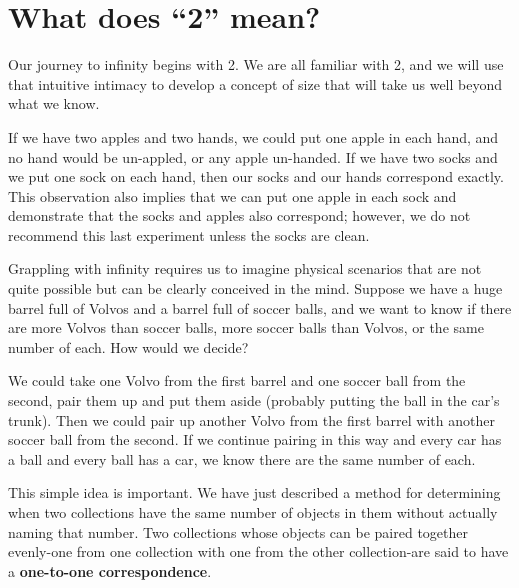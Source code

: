 \section{What does ``2'' mean?} \label{sec:correspondence}

Our journey to infinity begins with 2. We are all familiar with 2, and we will use that intuitive
intimacy to develop a concept of size that will take us well beyond what we know.

If we have two apples and two hands, we could put one apple in each hand, and no hand would be un-appled, or any apple un-handed. If we have two socks and we put one sock on each hand, then our socks and
our hands correspond exactly. This observation also implies that we can put one apple in each sock and demonstrate that the socks and apples also correspond; however, we do not recommend this last experiment unless the socks are clean.


Grappling with infinity requires us to imagine physical scenarios that are not quite possible but can be clearly conceived in the mind. Suppose we have a huge barrel full of Volvos and a barrel full of soccer balls, and we want to know if there are more Volvos than soccer balls, more soccer
balls than Volvos, or the same number of each. How would we decide?

We could take one Volvo from the first barrel and one soccer ball from the second, pair them up and put them aside (probably putting the ball in the car's trunk). Then we could pair up another Volvo from the first barrel with another soccer ball from the second. If we continue pairing in this way and every car has a ball and every ball has a car, we know there are the same number of each.

This simple idea is important. We have just described a method for determining when two collections have the same number of objects in them without actually naming that number. Two collections whose objects can be paired together evenly-one from one collection with one from the other collection-are said to have a \textbf{one-to-one correspondence}.
\clearpage

